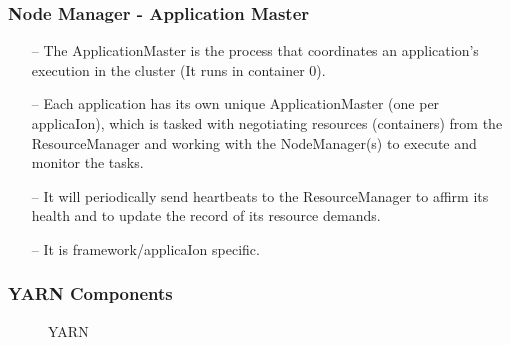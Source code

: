 \begin{frame}[c]{ }
	\frametitle{Node Manager - Application Master }
	
	{\footnotesize
		\begin{itemize}  [<+->]
			\item [--] The ApplicationMaster is the process that coordinates an application’s execution in the cluster (It runs in container 0).

			\item [--] Each application has its own unique ApplicationMaster (one per applicaIon), which is tasked with negotiating resources (containers) from the ResourceManager and working with the NodeManager(s) to execute and monitor the tasks.

			\item [--] It will periodically send heartbeats to the ResourceManager to affirm its health and to update the record of its resource demands.

			\item [--] It is framework/applicaIon specific.			

		\end{itemize}
	}
\end{frame}

\begin{frame}[c]{ }
	\frametitle{YARN Components }
		\begin{figure}
		\centering
		
		\caption{YARN } \label{fig:yarn}
	\end{figure}
\end{frame}


